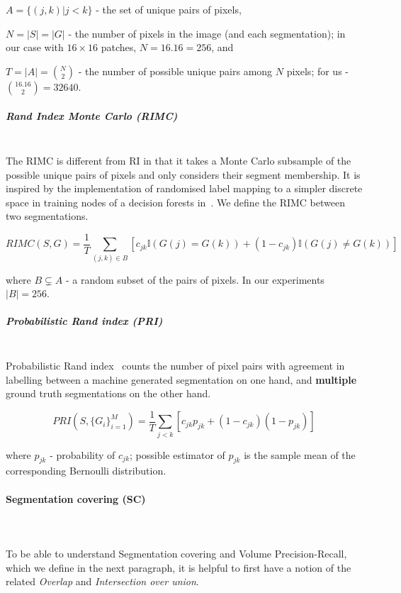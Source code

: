 $A=\{(j,k)|j<k\}$ - the set of unique pairs of pixels,

$N=\left|S\right|=\left|G\right|$ - the number of pixels in the image
(and each segmentation); in our case with $16\times 16$ patches, $N=16 . 16 = 256$, and 

$T=|A|=\binom{N}{2}$ - the number of possible unique pairs among
$N$ pixels; for us - $\binom{16 . 16}{2}=32 640$.


\subparagraph*{Rand Index Monte Carlo (RIMC)}\mbox{}\\ %
\label{par:ch4-RIMC-maths}
The RIMC is different from RI in that it takes a Monte Carlo subsample of the possible unique pairs of pixels and only considers their segment membership. It is inspired by the implementation of randomised label mapping to a simpler discrete space in training nodes of a decision forests in~\cite{DollarICCV13edges}. We define the RIMC between two segmentations.

\[
RIMC(S,G)=\frac{1}{T}\sum\limits _{(j,k)\in B}\left[c_{jk}\mathbb{I}\left(G(j)=G(k)\right)+(1-c_{jk})\mathbb{I}\left(G(j)\neq G(k)\right)\right]
\]

where $B\subsetneq A$ - a random subset of the pairs of pixels.
In our experiments $|B|=256$.


\subparagraph*{Probabilistic Rand index (PRI)}\mbox{}\\
\label{par:ch4-PRI-maths}
Probabilistic Rand index~\cite{UnnikrishnanPH07} counts the number of pixel pairs with agreement in %
labelling between a machine generated segmentation on one hand, and \textbf{multiple} ground truth segmentations on the other hand.


\[
PRI(S,\{G_{i}\}_{i=1}^{M})=\frac{1}{T}\sum\limits _{j<k}\left[c_{jk}p_{jk}+\left(1-c_{jk}\right)\left(1-p_{jk}\right)\right]
\]


where $p_{jk}$ - probability of $c_{jk}$; possible estimator of
$p_{jk}$ is the sample mean of the corresponding Bernoulli distribution.


\paragraph{Segmentation covering (SC)}\mbox{}\\\mbox{}\\
\label{par:ch4-SC-maths}
To be able to understand Segmentation covering and Volume Precision-Recall, which we define in the next paragraph, it is helpful to first have a notion of the related \textit{Overlap} and \textit{Intersection over union}.

